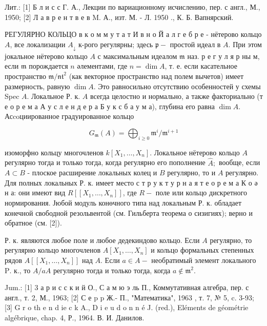 \documentclass[10pt]{article}
\begin{document}
Лит.: [1] Б л и с с Г. А., Лекции по вариационному исчислению, пер. с англ., М., 1950; [2] Л а в р е н т в е в M. А., изт. М. - Л. 1950 ., К. Б. Вапнярский.



РЕГУЛЯР̈НО КОЛЬЦО в к о м м у т а т И в н о Й а л г е б р е - нётерово кольцо $A$, все локализации $A_{\downarrow}$ к-рого регулярны; здесь $\mathfrak{p}-$ простой идеал в $A$. При этом јокальное нётерово кольцо $A$ с максимальным идеалом $\mathfrak{m}$ наз. р е г у л я р ны м, если $\mathfrak{m}$ порождается $n$ әлементами, где $n=\operatorname{dim} A$, т. е. если касательное пространство $\mathfrak{m} / \mathfrak{n t}^{2}$ (как векторное пространство над полем вычетов) имеет размерность, равную $\operatorname{dim} A$. Это равносильно отсутствию особенностей у схемы Spec $A$. Локальное Р. к. $A$ всегда целостно и нормально, а также факториально (т е о р е м а А у с л е н д е р а Б у к с б а у м а), глубина его равна $\operatorname{dim} A$. Асcoциированное градуированное кольцо



\[

G_{\mathfrak{m}}(A)=\bigoplus_{i \geqslant 0} \mathfrak{m}^{i} / \mathfrak{m}^{i+1}

\]



изоморфно кольцу многочленов $k\left[X_{1}, \ldots, X_{n}\right]$. Локальное нётерово кольцо $A$ регулярно тогда и только тогда, когда регулярно его пополнение $\widehat{A} ;$ вообще, если $A \subset B$ - плоское расширение локальных колец и $B$ регулярно, то и $A$ регулярно. Для полных локальных Р. к. имеет место с т р у к т у р н а я т е о р е м а К о ә н а: они имеют вид $R\left[\left[X_{1}, \ldots, X_{n}\right]\right]$, где $R-$ поле или кольцо дискретного нормирования. Јюбой модуль конөчного типа над локальным Р. к. обладает конечной свободной резольвентой (см. Гильберта теорема о сизигиях); верно и обратное (см. [2]).



Р. к. являются любое поле и любое дедекиндово кольцо. Если $A$ регулярно, то регулярно кольцо многочленов $A\left[X_{1}, \ldots, X_{n}\right]$ и кольцо формальных степенных рядов $A\left[\left[X_{1}, \ldots, X_{n}\right]\right]$ над $A$. Если $a \in A-$ необратимый элемент локального $\mathrm{P}$. к., то $A / a A$ регулярно тогда и только тогда, когда $a \notin \mathfrak{m}^{2}$.



Jum.: [1] 3 а р и с с к и й О., С а м ю э ль П., Коммутативная алгебра, пер. с англ., т. 2, М., 1963; [2] С е p p Ж.- П., "Математика", 1963 , т. 7, № 5, c. 3-93; [3] G r o th e n d ie c k A., D i e u d o n n é J. (red.), Eléments de géométrie algébrique, chap. 4, Р., 1964. В. И. Данилов.
\end{document}
